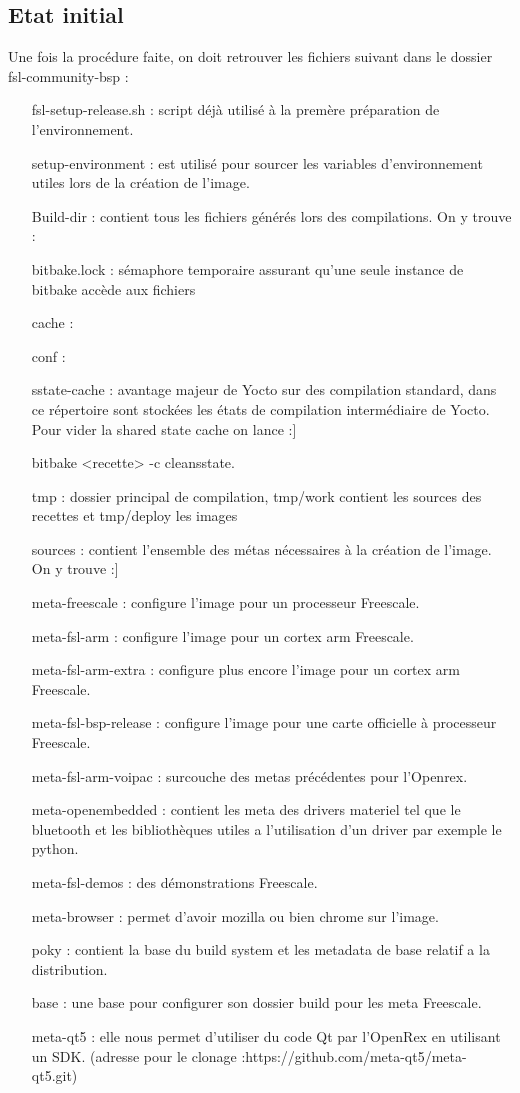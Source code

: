 \subsection{Etat initial}
Une fois la procédure faite, on doit retrouver les fichiers suivant dans le
dossier fsl-community-bsp :
\begin{itemize}
	\item[fsl-setup-release.sh :] script déjà utilisé à la premère préparation
	de l’environnement.
	\item[setup-environment :] est utilisé pour sourcer les variables d'environnement
	utiles lors de la création de l'image.
	\item[Build-dir :] contient tous les fichiers générés lors des compilations.
	On y trouve :
	\item[bitbake.lock :] sémaphore temporaire assurant qu’une seule instance de bitbake
	accède aux fichiers
	\item[cache :]
	\item[conf :]
	\item[sstate-cache :] avantage majeur de Yocto sur des compilation standard, dans ce répertoire sont stockées les états de compilation intermédiaire de Yocto. Pour vider la shared state cache on lance :]
	\begin{tcolorbox}
		bitbake <recette> -c cleansstate.
	\end{tcolorbox}

	\item[tmp :] dossier principal de compilation, tmp/work contient les sources des recettes et tmp/deploy les images
	\item[sources :] contient l'ensemble des     métas nécessaires à la création de l'image. On y trouve :]
	\item[meta-freescale :] configure l’image pour un processeur Freescale.
	\item[meta-fsl-arm :] configure l'image pour un cortex arm Freescale.
	\item[meta-fsl-arm-extra :] configure plus encore l'image pour un cortex arm Freescale.
	\item[meta-fsl-bsp-release :] configure l’image pour une carte officielle à processeur Freescale.
	\item[meta-fsl-arm-voipac :] surcouche des metas précédentes pour l’Openrex.
	\item[meta-openembedded :] contient les meta des drivers materiel tel que le bluetooth et les bibliothèques utiles a l'utilisation d’un driver par exemple le python.
	\item[meta-fsl-demos :] des démonstrations Freescale.
	\item[meta-browser :] permet d’avoir mozilla ou bien chrome sur l’image.
	\item[poky :] contient la base du build system et les metadata de base relatif a la distribution.
	\item[base :] une base pour configurer son dossier build pour les meta Freescale.
	\item[meta-qt5 :] elle nous permet d'utiliser du code Qt par l’OpenRex en utilisant un SDK. (adresse pour le clonage :https://github.com/meta-qt5/meta-qt5.git)


\end{itemize}
